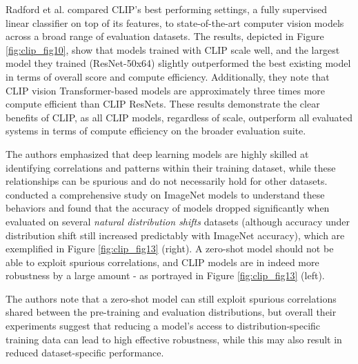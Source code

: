\documentclass{article}
\begin{document}
Radford et al. compared CLIP's best performing settings, a fully supervised linear classifier on top of its features, to state-of-the-art computer vision models across a broad range of evaluation datasets. The results, depicted in Figure \ref{fig:clip_fig10}, show that models trained with CLIP scale well, and the largest model they trained (ResNet-50x64) slightly outperformed the best existing model in terms of overall score and compute efficiency. Additionally, they note that CLIP vision Transformer-based models are approximately three times more compute efficient than CLIP ResNets. These results demonstrate the clear benefits of CLIP, as all CLIP models, regardless of scale, outperform all evaluated systems in terms of compute efficiency on the broader evaluation suite.

\medskip
\noindent
The authors emphasized that deep learning models are highly skilled at identifying correlations and patterns within their training dataset, while these relationships can be spurious and do not necessarily hold for other datasets. \citet{taori2020measuring} conducted a comprehensive study on ImageNet models to understand these behaviors and found that the accuracy of models dropped significantly when evaluated on several \emph{natural distribution shifts} datasets (although accuracy under distribution shift still increased predictably with ImageNet accuracy), which are exemplified in Figure \ref{fig:clip_fig13} (right). A zero-shot model should not be able to exploit spurious correlations, and CLIP models are in indeed more robustness by a large amount - as portrayed in Figure \ref{fig:clip_fig13} (left).

\medskip
\noindent
The authors note that a zero-shot model can still exploit spurious correlations shared between the pre-training and evaluation distributions, but overall their experiments suggest that reducing a model's access to distribution-specific training data can lead to high effective robustness, while this may also result in reduced dataset-specific performance.
\end{document}
